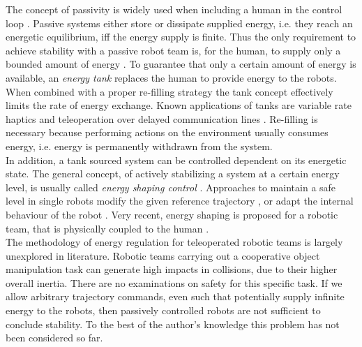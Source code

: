 \documentclass[a4paper,twoside, openright,12pt]{report}
\begin{document}
{The concept of passivity is widely used when including a human in the control loop \cite{Hirche_12}. Passive systems either store or dissipate supplied energy, i.e. they reach an energetic equilibrium, iff the energy supply is finite. Thus the only requirement to achieve stability with a passive robot team is, for the human, to supply only a bounded amount of energy \cite{Stramigioli_15}. To guarantee that only a certain amount of energy is available, an \emph{energy tank} replaces the human to provide energy to the robots. When combined with a proper re-filling strategy the tank concept effectively limits the rate of energy exchange. Known applications of tanks are variable rate haptics \cite{Lee_10} and teleoperation over delayed communication lines \cite{Franken_11}. Re-filling is necessary because performing actions on the environment usually consumes energy, i.e. energy is permanently withdrawn from the system.\\ 
In addition, a tank sourced system can be controlled dependent on its energetic state. The general concept, of actively stabilizing a system at a certain energy level, is usually called \emph{energy shaping control} \cite{Ortega_99}. Approaches to maintain a safe level in single robots modify the given reference trajectory \cite{Laffranchi_09}, or adapt the internal behaviour of the robot \cite{Tadele_14}. Very recent, energy shaping is proposed for a robotic team, that is physically coupled to the human \cite{Geravand_16}.\\
The methodology of energy regulation for teleoperated robotic teams is largely unexplored in literature. Robotic teams carrying out a cooperative object manipulation task can generate high impacts in collisions, due to their higher overall inertia. There are no examinations on safety for this specific task. If we allow arbitrary trajectory commands, even such that potentially supply infinite energy to the robots, then passively controlled robots are not sufficient to conclude stability. To the best of the author's knowledge this problem has not been considered so far.







}
\end{document}

